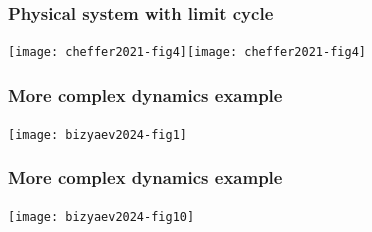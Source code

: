\documentclass{beamer-control}
\begin{document}
\begin{frame}
\frametitle{Physical system with limit cycle}
\framesubtitle{}

\texttt{[image: cheffer2021-fig4]}\hfil\texttt{[image: cheffer2021-fig4]}


\end{frame}

\begin{frame}
\frametitle{More complex dynamics example}
\framesubtitle{}

\texttt{[image: bizyaev2024-fig1]}

\end{frame}

\begin{frame}
\frametitle{More complex dynamics example}
\framesubtitle{}

\texttt{[image: bizyaev2024-fig10]}

\end{frame}


\SUMMARYFRAME
\FINALE
\end{document}
